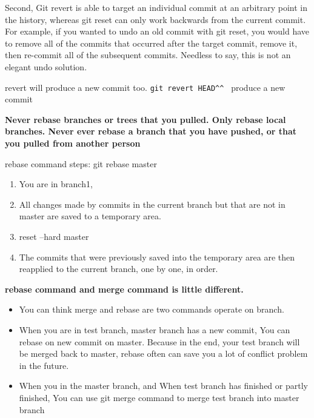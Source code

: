 \documentclass[paper=8.5in:11in, twoside, 12pt, pagesize=pdftex]{book}
\newcommand{\linuxcommand}[1]{\texttt{\textcolor{blue}{\$ #1 \Pisymbol{psy}{191}}}}
\begin{document}
	Second, Git revert is able to target an individual commit at an arbitrary point in the history, whereas git reset can only work backwards from the current commit. For example, if you wanted to undo an old commit with git reset, you would have to remove all of the commits that occurred after the target commit, remove it, then re-commit all of the subsequent commits. Needless to say, this is not an elegant undo solution.
	
	revert will produce a new commit too. \verb=git revert HEAD^^ = produce a new commit
	
	\textbf{Never rebase branches or trees that you pulled. Only rebase local branches.  Never ever rebase a branch that you have pushed, or that you pulled from another person}
	
	rebase command steps: git rebase master
	\begin{enumerate}
		\item You are in branch1, 
		\item All changes made by commits in the current branch but that are not in master are saved to a temporary area.
		\item reset --hard master
		\item The commits that were previously saved into the temporary area are then reapplied to the current branch, one by one, in order.
	\end{enumerate}
	
	
	\textbf{rebase command and merge command is little different.}
\begin{itemize}
	\item You can think merge and rebase are two commands operate on branch.
	
	\item When you are in test branch, master branch has a new commit, You can rebase on new commit on master. Because in the end, your test branch will be merged back to master, rebase often can save you a lot of conflict problem in the future.
	
	\item When you in the master branch, and When test branch has finished or partly finished, You can use git merge command to merge test branch into master branch
\end{itemize}
	
	
\end{document}
